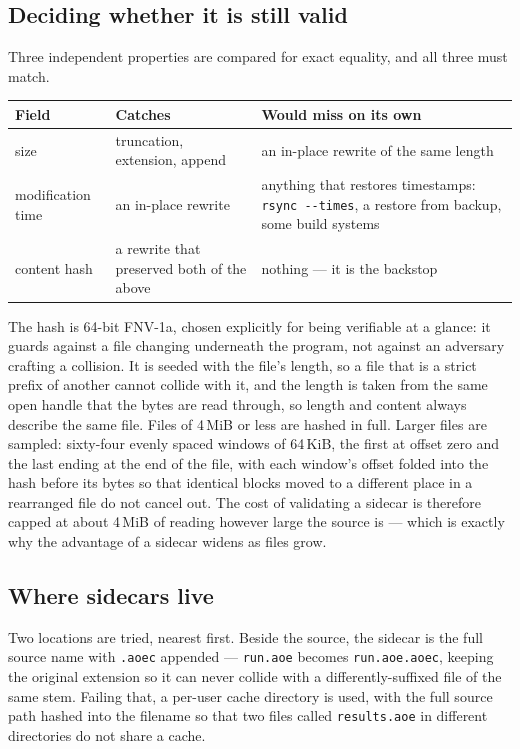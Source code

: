 \documentclass[11pt,a4paper,oneside]{report}
\newcommand{\code}[1]{\texttt{#1}}
\begin{document}
\subsection{Deciding whether it is still valid}

Three independent properties are compared for exact equality, and all three must
match.

\begin{center}
\small
\begin{tabular}{@{}p{}p{}p{}@{}}
\toprule
\textbf{Field} & \textbf{Catches} & \textbf{Would miss on its own} \\
\midrule
size & truncation, extension, append & an in-place rewrite of the same length \\
modification time & an in-place rewrite & anything that restores timestamps: \code{rsync -{}-times}, a restore from backup, some build systems \\
content hash & a rewrite that preserved both of the above & nothing --- it is the backstop \\
\bottomrule
\end{tabular}
\end{center}

The hash is 64-bit FNV-1a, chosen explicitly for being verifiable at a glance: it
guards against a file changing underneath the program, not against an adversary
crafting a collision. It is seeded with the file's length, so a file that is a
strict prefix of another cannot collide with it, and the length is taken from the
same open handle that the bytes are read through, so length and content always
describe the same file. Files of 4\,MiB or less are hashed in full. Larger files
are sampled: sixty-four evenly spaced windows of 64\,KiB, the first at offset zero
and the last ending at the end of the file, with each window's offset folded into
the hash before its bytes so that identical blocks moved to a different place in
a rearranged file do not cancel out. The cost of validating a sidecar is
therefore capped at about 4\,MiB of reading however large the source is --- which
is exactly why the advantage of a sidecar widens as files grow.

\subsection{Where sidecars live}

Two locations are tried, nearest first. Beside the source, the sidecar is the
full source name with \code{.aoec} appended --- \code{run.aoe} becomes
\code{run.aoe.aoec}, keeping the original extension so it can never collide with
a differently-suffixed file of the same stem. Failing that, a per-user cache
directory is used, with the full source path hashed into the filename so that two
files called \code{results.aoe} in different directories do not share a cache.
\end{document}
